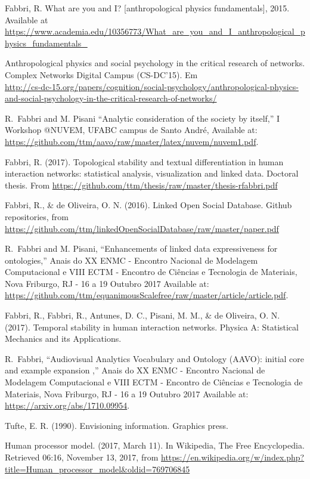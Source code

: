 \documentclass[letterpaper,10pt]{article}
\begin{document}
\begin{thebibliography}{99}

	Fabbri, R. What are you and I? [anthropological physics fundamentals], 2015. Available at \url{https://www.academia.edu/10356773/What\_are\_you\_and\_I\_anthropological\_physics\_fundamentals\_}

	Anthropological physics and social psychology in the critical research of networks. Complex Networks Digital Campus (CS-DC'15).
	Em \\\url{http://cs-dc-15.org/papers/cognition/social-psychology/anthropological-physics-and-social-psychology-in-the-critical-research-of-networks/}

  R.~Fabbri and M. Pisani
  ``Analytic consideration of the society by itself,''
  I Workshop @NUVEM, UFABC campus de Santo André,
		Available at: \url{https://github.com/ttm/aavo/raw/master/latex/nuvem/nuvem1.pdf}.

Fabbri, R. (2017). Topological stability and textual differentiation in human interaction networks:
		statistical analysis, visualization and linked data. Doctoral thesis.
		From \url{https://github.com/ttm/thesis/raw/master/thesis-rfabbri.pdf}

	Fabbri, R., \& de Oliveira, O. N. (2016). Linked Open Social Database. Github repositories, from \url{https://github.com/ttm/linkedOpenSocialDatabase/raw/master/paper.pdf}

  R.~Fabbri and M. Pisani,
  ``Enhancements of linked data expressiveness for ontologies,''
  Anais do XX ENMC - Encontro Nacional de Modelagem Computacional e
  VIII ECTM - Encontro de Ci\^encias e Tecnologia de Materiais, Nova Friburgo,
  RJ - 16 a 19 Outubro 2017
		Available at: \url{https://github.com/ttm/equanimousScalefree/raw/master/article/article.pdf}.

Fabbri, R., Fabbri, R., Antunes, D. C., Pisani, M. M., \& de Oliveira, O. N. (2017). Temporal stability in human interaction networks. Physica A: Statistical Mechanics and its Applications.

  R.~Fabbri,
		``Audiovisual Analytics Vocabulary and Ontology (AAVO): initial core and example expansion ,''
  Anais do XX ENMC - Encontro Nacional de Modelagem Computacional e
  VIII ECTM - Encontro de Ci\^encias e Tecnologia de Materiais, Nova Friburgo,
  RJ - 16 a 19 Outubro 2017
		Available at: \url{https://arxiv.org/abs/1710.09954}.

	Tufte, E. R. (1990). Envisioning information. Graphics press.

	Human processor model. (2017, March 11). In Wikipedia, The Free Encyclopedia. Retrieved 06:16, November 13, 2017, from \url{https://en.wikipedia.org/w/index.php?title=Human_processor_model&oldid=769706845}

\end{thebibliography}
\end{document}
